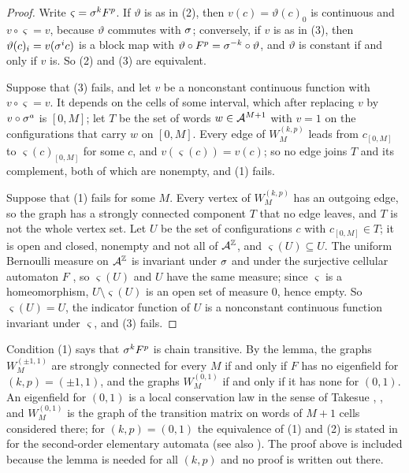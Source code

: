 \begin{proof}
Write $\varsigma=\sigma^kF^p$. If $\vartheta$ is as in (2), then $v(c)=\vartheta(c)_0$ is continuous and $v\circ\varsigma=v$, because $\vartheta$ commutes with $\sigma$; conversely, if $v$ is as in (3), then $\vartheta(c)_i=v(\sigma^ic)$ is a block map with $\vartheta\circ F^p=\sigma^{-k}\circ\vartheta$, and $\vartheta$ is constant if and only if $v$ is. So (2) and (3) are equivalent.

Suppose that (3) fails, and let $v$ be a nonconstant continuous function with $v\circ\varsigma=v$. It depends on the cells of some interval, which after replacing $v$ by $v\circ\sigma^a$ is $[0,M]$; let $T$ be the set of words $w\in\mathcal{A}^{M+1}$ with $v=1$ on the configurations that carry $w$ on $[0,M]$. Every edge of $W^{(k,p)}_M$ leads from $c_{[0,M]}$ to $\varsigma(c)_{[0,M]}$ for some $c$, and $v(\varsigma(c))=v(c)$; so no edge joins $T$ and its complement, both of which are nonempty, and (1) fails.

Suppose that (1) fails for some $M$. Every vertex of $W^{(k,p)}_M$ has an outgoing edge, so the graph has a strongly connected component $T$ that no edge leaves, and $T$ is not the whole vertex set. Let $U$ be the set of configurations $c$ with $c_{[0,M]}\in T$; it is open and closed, nonempty and not all of $\mathcal{A}^{\mathbb{Z}}$, and $\varsigma(U)\subseteq U$. The uniform Bernoulli measure on $\mathcal{A}^{\mathbb{Z}}$ is invariant under $\sigma$ and under the surjective cellular automaton $F$ \cite{Hedlund1969}, so $\varsigma(U)$ and $U$ have the same measure; since $\varsigma$ is a homeomorphism, $U\setminus\varsigma(U)$ is an open set of measure $0$, hence empty. So $\varsigma(U)=U$, the indicator function of $U$ is a nonconstant continuous function invariant under $\varsigma$, and (3) fails.
\end{proof}

Condition (1) says that $\sigma^kF^p$ is chain transitive. By the lemma, the graphs $W^{(\pm1,1)}_M$ are strongly connected for every $M$ if and only if $F$ has no eigenfield for $(k,p)=(\pm1,1)$, and the graphs $W^{(0,1)}_M$ if and only if it has none for $(0,1)$. An eigenfield for $(0,1)$ is a local conservation law in the sense of Takesue \cite{Takesue1987}, \cite[Section~4]{Takesue1989}, and $W^{(0,1)}_M$ is the graph of the transition matrix on words of $M+1$ cells considered there; for $(k,p)=(0,1)$ the equivalence of (1) and (2) is stated in \cite[Section~4]{Takesue1989} for the second-order elementary automata (see also \cite[Proposition~4.1]{HT1991}). The proof above is included because the lemma is needed for all $(k,p)$ and no proof is written out there.
